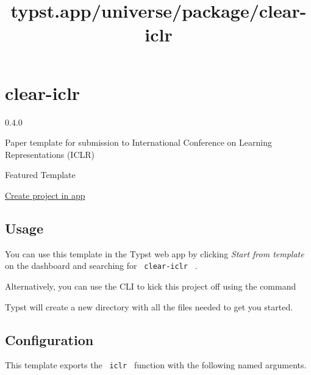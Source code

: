 \title{typst.app/universe/package/clear-iclr}

\label{banner}
\label{template-thumbnail}

\section{clear-iclr}\label{clear-iclr}

{ 0.4.0 }

Paper template for submission to International Conference on Learning
Representations (ICLR)

{ } Featured Template

\href{/app?template=clear-iclr&version=0.4.0}{Create project in app}

\label{readme}
\subsection{Usage}\label{usage}

You can use this template in the Typst web app by clicking \emph{Start
from template} on the dashboard and searching for
\texttt{\ clear-iclr\ } .

Alternatively, you can use the CLI to kick this project off using the
command

\begin{Shaded}
\begin{Highlighting}[]
\end{Highlighting}
\end{Shaded}

Typst will create a new directory with all the files needed to get you
started.

\subsection{Configuration}\label{configuration}

This template exports the \texttt{\ iclr\ } function with the following
named arguments.

